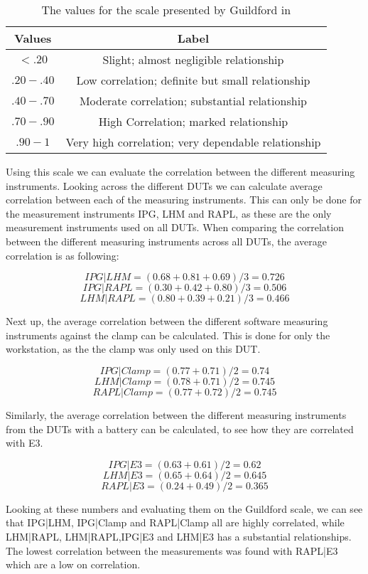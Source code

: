 \begin{table}[ht]
    \centering
    \begin{tabular}{|| c | c ||}
        \hline
        \textbf{Values} & \textbf{Label} \\ [0.5ex] \hline\hline
        $<.20$ & Slight; almost negligible relationship \\
        $.20-.40$ & Low correlation; definite but small relationship \\
        $.40-.70$ & Moderate correlation; substantial relationship \\
        $.70-.90$ & High Correlation; marked relationship \\
        $.90-1$ & Very high correlation; very dependable relationship \\ \hline
    \end{tabular}
    \caption{The values for the scale presented by Guildford in \cite[219]{guilford1950fundamental} }
    \label{tab:GuildfordScale}
\end{table}

Using this scale we can evaluate the correlation between the different measuring instruments. Looking across the different DUTs we can calculate average correlation between each of the measuring instruments. This can only be done for the measurement instruments IPG, LHM and RAPL, as these are the only measurement instruments used on all DUTs. When comparing the correlation between the different measuring instruments across all DUTs, the average correlation is as following:

$$IPG|LHM = (0.68+0.81+0.69)/3 = 0.726$$
$$IPG|RAPL = (0.30+0.42+0.80)/3 = 0.506$$
$$LHM|RAPL = (0.80+0.39+0.21)/3 = 0.466$$

Next up, the average correlation between the different software measuring instruments against the clamp can be calculated. This is done for only the workstation, as the the clamp was only used on this DUT.

$$IPG|Clamp = (0.77+0.71)/2 = 0.74$$
$$LHM|Clamp = (0.78+0.71)/2 = 0.745$$
$$RAPL|Clamp = (0.77+0.72)/2 = 0.745$$

Similarly, the average correlation between the different measuring instruments from the DUTs with a battery can be calculated, to see how they are correlated with E3.

$$IPG|E3 = (0.63+0.61)/2 = 0.62$$
$$LHM|E3 = (0.65+0.64)/2 = 0.645$$
$$RAPL|E3 = (0.24+0.49)/2 = 0.365$$

Looking at these numbers and evaluating them on the Guildford scale, we can see that IPG|LHM, IPG|Clamp and RAPL|Clamp all are highly correlated, while LHM|RAPL, LHM|RAPL,IPG|E3 and LHM|E3 has a substantial relationships. The lowest correlation between the measurements was found with RAPL|E3 which are a low on correlation.

